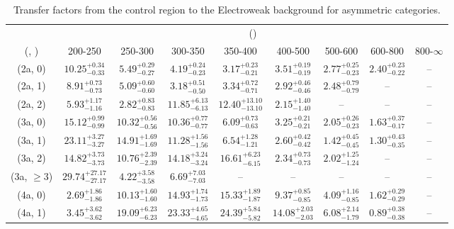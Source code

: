 \begin{table}[h!]
\tiny
\centering
\caption{Transfer factors from the \mmj control region to the Electroweak background for asymmetric categories.\label{tab:tf_mumu_total_asym}}
\begin{tabular}
{ccccccccc}
	\hline\hline
	& \multicolumn{8}{c}{\scalht (\gev)} \\ 
	 (\njet,  \nb) & 200-250 & 250-300 & 300-350 & 350-400 & 400-500 & 500-600 & 600-800 & 800-$\infty$ \\ [0.8ex] 
\hline
	(2a, 0) & $10.25^{+ 0.34 }_{- 0.33 }$ & $5.49^{+ 0.29 }_{- 0.27 }$ & $4.19^{+ 0.24 }_{- 0.23 }$ & $3.17^{+ 0.23 }_{- 0.21 }$ & $3.51^{+ 0.19 }_{- 0.19 }$ & $2.77^{+ 0.25 }_{- 0.23 }$ & $2.40^{+ 0.23 }_{- 0.22 }$ & -- \\[0.5ex] 
	(2a, 1) & $8.91^{+ 0.73 }_{- 0.73 }$ & $5.09^{+ 0.60 }_{- 0.60 }$ & $3.18^{+ 0.51 }_{- 0.50 }$ & $3.34^{+ 0.72 }_{- 0.71 }$ & $2.92^{+ 0.46 }_{- 0.46 }$ & $2.48^{+ 0.79 }_{- 0.79 }$ & -- & -- \\[0.5ex] 
	(2a, 2) & $5.93^{+ 1.17 }_{- 1.16 }$ & $2.82^{+ 0.83 }_{- 0.83 }$ & $11.85^{+ 6.13 }_{- 6.13 }$ & $12.40^{+ 13.10 }_{- 13.10 }$ & $2.15^{+ 1.40 }_{- 1.40 }$ & -- & -- & -- \\[0.5ex] 
	(3a, 0) & $15.12^{+ 0.99 }_{- 0.99 }$ & $10.32^{+ 0.56 }_{- 0.56 }$ & $10.36^{+ 0.77 }_{- 0.77 }$ & $6.09^{+ 0.73 }_{- 0.63 }$ & $3.25^{+ 0.21 }_{- 0.21 }$ & $2.05^{+ 0.26 }_{- 0.23 }$ & $1.63^{+ 0.37 }_{- 0.17 }$ & -- \\[0.5ex] 
	(3a, 1) & $23.11^{+ 3.27 }_{- 3.27 }$ & $14.91^{+ 1.69 }_{- 1.69 }$ & $11.28^{+ 1.56 }_{- 1.56 }$ & $6.54^{+ 1.28 }_{- 1.21 }$ & $2.60^{+ 0.42 }_{- 0.42 }$ & $1.42^{+ 0.45 }_{- 0.45 }$ & $1.30^{+ 0.43 }_{- 0.35 }$ & -- \\[0.5ex] 
	(3a, 2) & $14.82^{+ 3.73 }_{- 3.73 }$ & $10.76^{+ 2.39 }_{- 2.39 }$ & $14.18^{+ 3.24 }_{- 3.24 }$ & $16.61^{+ 6.23 }_{- 6.15 }$ & $2.34^{+ 0.73 }_{- 0.73 }$ & $2.02^{+ 1.25 }_{- 1.24 }$ & -- & -- \\[0.5ex] 
	(3a, $\ge3$) & $29.74^{+ 27.17 }_{- 27.17 }$ & $4.22^{+ 3.58 }_{- 3.58 }$ & $6.69^{+ 7.03 }_{- 7.03 }$ & -- & -- & -- & -- & -- \\[0.5ex] 
	(4a, 0) & $2.69^{+ 1.86 }_{- 1.86 }$ & $10.13^{+ 1.60 }_{- 1.60 }$ & $14.93^{+ 1.74 }_{- 1.73 }$ & $15.33^{+ 1.89 }_{- 1.87 }$ & $9.37^{+ 0.85 }_{- 0.85 }$ & $4.09^{+ 1.16 }_{- 0.85 }$ & $1.62^{+ 0.29 }_{- 0.29 }$ & -- \\[0.5ex] 
	(4a, 1) & $3.45^{+ 3.62 }_{- 3.62 }$ & $19.09^{+ 6.23 }_{- 6.23 }$ & $23.33^{+ 4.65 }_{- 4.65 }$ & $24.39^{+ 5.84 }_{- 5.82 }$ & $14.08^{+ 2.03 }_{- 2.03 }$ & $6.08^{+ 2.14 }_{- 1.79 }$ & $0.89^{+ 0.38 }_{- 0.38 }$ & -- \\[0.5ex] 

\end{tabular}
\end{table}
